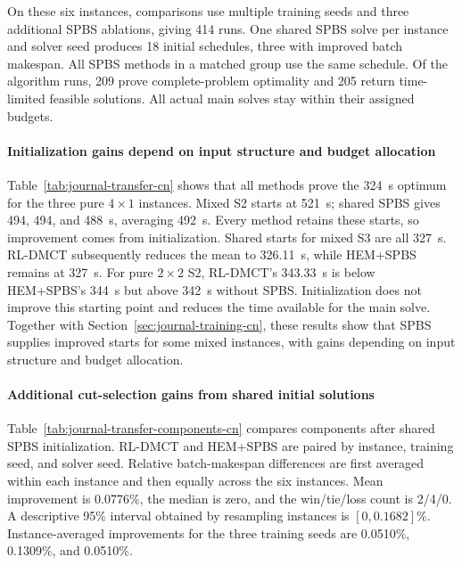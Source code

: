\documentclass[final,5p,times,twocolumn]{elsarticle}
\newcounter{algorithm}
\begin{document}
On these six instances, comparisons use multiple training seeds and three additional SPBS ablations, giving 414 runs. One shared SPBS solve per instance and solver seed produces 18 initial schedules, three with improved batch makespan. All SPBS methods in a matched group use the same schedule. Of the algorithm runs, 209 prove complete-problem optimality and 205 return time-limited feasible solutions. All actual main solves stay within their assigned budgets.

\paragraph{Initialization gains depend on input structure and budget allocation}
Table~\ref{tab:journal-transfer-cn} shows that all methods prove the 324~s optimum for the three pure $4\times1$ instances. Mixed S2 starts at 521~s; shared SPBS gives 494, 494, and 488~s, averaging 492~s. Every method retains these starts, so improvement comes from initialization. Shared starts for mixed S3 are all 327~s. RL-DMCT subsequently reduces the mean to 326.11~s, while HEM+SPBS remains at 327~s. For pure $2\times2$ S2, RL-DMCT's 343.33~s is below HEM+SPBS's 344~s but above 342~s without SPBS. Initialization does not improve this starting point and reduces the time available for the main solve. Together with Section~\ref{sec:journal-training-cn}, these results show that SPBS supplies improved starts for some mixed instances, with gains depending on input structure and budget allocation.

\paragraph{Additional cut-selection gains from shared initial solutions}
Table~\ref{tab:journal-transfer-components-cn} compares components after shared SPBS initialization. RL-DMCT and HEM+SPBS are paired by instance, training seed, and solver seed. Relative batch-makespan differences are first averaged within each instance and then equally across the six instances. Mean improvement is 0.0776\%, the median is zero, and the win/tie/loss count is 2/4/0. A descriptive 95\% interval obtained by resampling instances is $[0,0.1682]\%$. Instance-averaged improvements for the three training seeds are 0.0510\%, 0.1309\%, and 0.0510\%.
\end{document}
